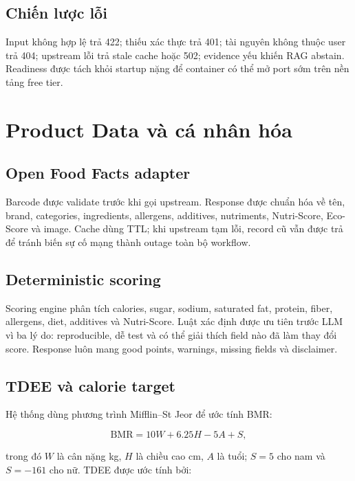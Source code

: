 \documentclass[12pt,a4paper]{report}
\begin{document}
\section{Chiến lược lỗi}

Input không hợp lệ trả 422; thiếu xác thực trả 401; tài nguyên không thuộc user
trả 404; upstream lỗi trả stale cache hoặc 502; evidence yếu khiến RAG abstain.
Readiness được tách khỏi startup nặng để container có thể mở port sớm trên nền
tảng free tier.

\chapter{Product Data và cá nhân hóa}

\section{Open Food Facts adapter}

Barcode được validate trước khi gọi upstream. Response được chuẩn hóa về tên,
brand, categories, ingredients, allergens, additives, nutriments, Nutri-Score,
Eco-Score và image. Cache dùng TTL; khi upstream tạm lỗi, record cũ vẫn được
trả để tránh biến sự cố mạng thành outage toàn bộ workflow.

\section{Deterministic scoring}

Scoring engine phân tích calories, sugar, sodium, saturated fat, protein,
fiber, allergens, diet, additives và Nutri-Score. Luật xác định được ưu tiên
trước LLM vì ba lý do: reproducible, dễ test và có thể giải thích field nào đã
làm thay đổi score. Response luôn mang good points, warnings, missing fields và
disclaimer.

\section{TDEE và calorie target}

Hệ thống dùng phương trình Mifflin--St Jeor \cite{mifflin} để ước tính BMR:

\begin{equation}
\mathrm{BMR}=10W+6.25H-5A+S,
\end{equation}

trong đó $W$ là cân nặng kg, $H$ là chiều cao cm, $A$ là tuổi; $S=5$ cho nam
và $S=-161$ cho nữ. TDEE được ước tính bởi:
\end{document}
